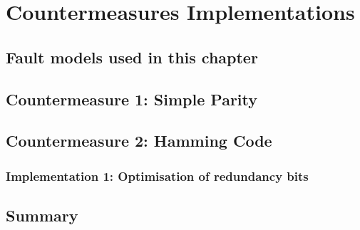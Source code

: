 \chapter{Countermeasures Implementations}
\label{chapter:countermeasures}
\minitoc

\section{Fault models used in this chapter}


\section{Countermeasure 1: Simple Parity}
\label{chapter:simpleparity}



\section{Countermeasure 2: Hamming Code}
\label{chapter:hammingcode}

    \subsection{Implementation 1: Optimisation of redundancy bits}

\section{Summary}


